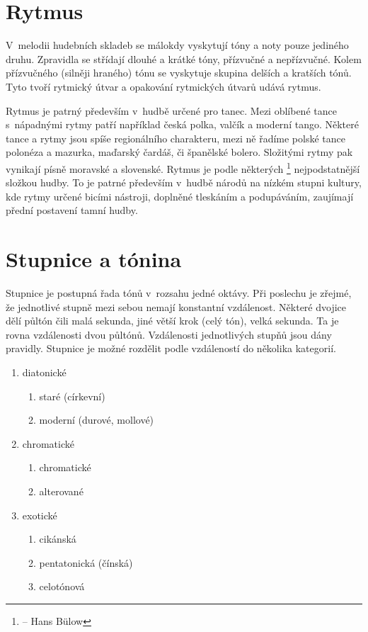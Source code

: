\section{Rytmus}
V~melodii hudebních skladeb se málokdy vyskytují tóny a noty pouze jediného druhu.
Zpravidla se střídají dlouhé a krátké tóny, přízvučné a nepřízvučné.
Kolem přízvučného (silněji hraného) tónu se vyskytuje skupina delších a kratších tónů.
Tyto tvoří rytmický útvar a opakování rytmických útvarů udává rytmus.

\par
Rytmus je patrný především v~hudbě určené pro tanec.
Mezi oblíbené tance s~nápadnými rytmy patří například česká polka,
valčík a moderní tango. 
Některé tance a rytmy jsou spíše regionálního charakteru, 
mezi ně řadíme polské tance polonéza a mazurka, maďarský čardáš, či španělské bolero.
Složitými rytmy pak vynikají písně moravské a slovenské.
Rytmus je podle některých
\footnote{ -- Hans Bülow} 
nejpodstatnější složkou hudby.
To je patrné především v~hudbě národů na nízkém stupni kultury,
kde rytmy určené bicími nástroji, doplněné tleskáním a podupáváním,
zaujímají přední postavení tamní hudby.
\cite{cmiral}

\section{Stupnice a tónina}
\label{stupnice}

Stupnice je postupná řada tónů v~rozsahu jedné oktávy.
Při poslechu je zřejmé, že jednotlivé stupně mezi sebou nemají konstantní vzdálenost.
\cite{kofron}
Některé dvojice dělí půltón čili malá sekunda, 
jiné větší krok (celý tón), velká sekunda.
Ta je rovna vzdálenosti dvou půltónů.
Vzdálenosti jednotlivých stupňů jsou dány pravidly.
\cite{cmiral}
Stupnice je možné rozdělit podle vzdáleností do několika kategorií.

\begin{enumerate}
	\item diatonické
	\begin{enumerate}
        \item staré (církevní)
        \item moderní (durové, mollové)
    \end{enumerate}
	\item chromatické
	\begin{enumerate}
        \item chromatické
        \item alterované
    \end{enumerate}
	\item exotické
	\begin{enumerate}
        \item cikánská
        \item pentatonická (čínská)
        \item celotónová
    \end{enumerate}
\end{enumerate}

